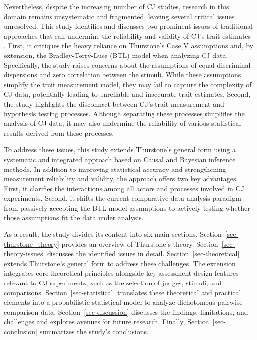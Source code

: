 \documentclass[
  authoryear,
  review,
  1p]{elsarticle}
\begin{document}
Nevertheless, despite the increasing number of CJ studies, research in
this domain remains unsystematic and fragmented, leaving several
critical issues unresolved. This study identifies and discusses two
prominent issues of traditional approaches that can undermine the
reliability and validity of CJ's trait estimates
\citep[pp.~2]{Perron_et_al_2015}. First, it critiques the heavy reliance
on Thurstone's Case V assumptions \citep{Thurstone_1927b} and, by
extension, the Bradley-Terry-Luce (BTL) model
\citep{Bradley_et_al_1952, Luce_1959} when analyzing CJ data.
Specifically, the study raises concerns about the assumptions of equal
discriminal dispersions and zero correlation between the stimuli. While
these assumptions simplify the trait measurement model, they may fail to
capture the complexity of CJ data, potentially leading to unreliable and
inaccurate trait estimates. Second, the study highlights the disconnect
between CJ's trait measurement and hypothesis testing processes.
Although separating these processes simplifies the analysis of CJ data,
it may also undermine the reliability of various statistical results
derived from these processes.

To address these issues, this study extends Thurstone's general form
using a systematic and integrated approach based on Causal and Bayesian
inference methods. In addition to improving statistical accuracy and
strengthening measurement reliability and validity, the approach offers
two key advantages. First, it clarifies the interactions among all
actors and processes involved in CJ experiments. Second, it shifts the
current comparative data analysis paradigm from passively accepting the
BTL model assumptions to actively testing whether those assumptions fit
the data under analysis.

As a result, the study divides its content into six main sections.
Section~\ref{sec-thurstone_theory} provides an overview of Thurstone's
theory. Section~\ref{sec-theory-issues} discusses the identified issues
in detail. Section~\ref{sec-theoretical} extends Thurstone's general
form to address these challenges. The extension integrates core
theoretical principles alongside key assessment design features relevant
to CJ experiments, such as the selection of judges, stimuli, and
comparisons. Section~\ref{sec-statistical} translates these theoretical
and practical elements into a probabilistic statistical model to analyze
dichotomous pairwise comparison data. Section~\ref{sec-discussion}
discusses the findings, limitations, and challenges and explores avenues
for future research. Finally, Section~\ref{sec-conclusion} summarizes
the study's conclusions.
\end{document}
